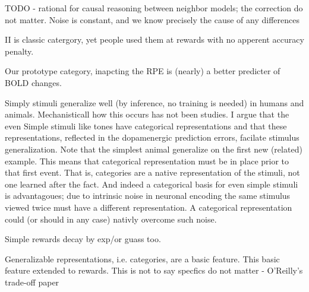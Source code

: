 TODO - rational for causal reasoning between neighbor models; the correction do not matter.  Noise is constant, and we know precisely the cause of any differences

II is classic catergory, yet people used them at rewards with no apperent accuracy penalty.

Our prototype category, inapcting the RPE is (nearly) a better predicter of BOLD changes.

Simply stimuli generalize well (by inference, no training is needed) in humans and animals.  Mechanisticall how this occurs has not been studies.  I argue that the even Simple stimuli like tones have categorical representations and that these representations, reflected in the dopamenergic prediction errors, facilate stimulus generalization.  Note that the simplest animal generalize on the first new (related) example.  This means that categorical representation must be in place prior to that first event.  That is, categories are a native representation of the stimuli, not one learned after the fact.  And indeed a categorical basis for even simple stimuli is advantagoues; due to intrinsic noise in neuronal encoding the same stimulus viewed twice must have a different representation.  A categorical representation could (or should in any case) nativly overcome such noise. 

Simple rewards decay by exp/or guass too.  

Generalizable representations, i.e. categories, are a basic feature.  This basic feature extended to rewards.  This is not to say specfics do not matter - O'Reilly's trade-off paper
